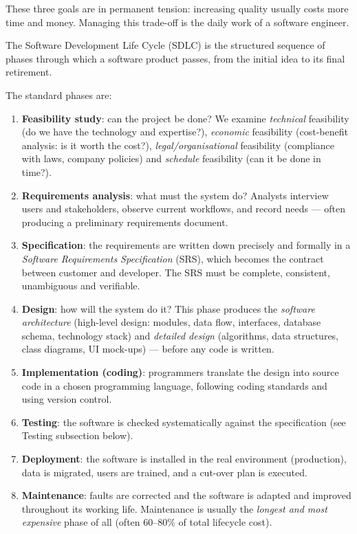\documentclass[11pt]{article}
\newcommand{\cle}[1]{{\popxbold\color{popdark}#1}}
\newcounter{popsec}
\newcounter{popsub}
\newcommand{\courssub}[1]{%
  \stepcounter{popsub}%
  \par\vspace{9pt}\noindent{\popxbold\fontsize{11.5}{13}\selectfont\color{popink}{\color{poporange}\thepopsec.\thepopsub}\hspace{6pt}#1}\par\nopagebreak\vspace{4pt}
}
\begin{document}
These three goals are in permanent tension: increasing quality usually costs more time and money. Managing this trade-off is the daily work of a software engineer.

\courssub{The Software Development Life Cycle (SDLC)}

\begin{definition}[SDLC]
The \cle{Software Development Life Cycle} (SDLC) is the structured sequence of phases through which a software product passes, from the initial idea to its final retirement.
\end{definition}

The standard phases are:

\begin{enumerate}
\item \textbf{Feasibility study}: can the project be done? We examine \emph{technical} feasibility (do we have the technology and expertise?), \emph{economic} feasibility (cost-benefit analysis: is it worth the cost?), \emph{legal/organisational} feasibility (compliance with laws, company policies) and \emph{schedule} feasibility (can it be done in time?).
\item \textbf{Requirements analysis}: what must the system do? Analysts interview users and stakeholders, observe current workflows, and record needs — often producing a preliminary requirements document.
\item \textbf{Specification}: the requirements are written down precisely and formally in a \emph{Software Requirements Specification} (SRS), which becomes the contract between customer and developer. The SRS must be complete, consistent, unambiguous and verifiable.
\item \textbf{Design}: how will the system do it? This phase produces the \emph{software architecture} (high-level design: modules, data flow, interfaces, database schema, technology stack) and \emph{detailed design} (algorithms, data structures, class diagrams, UI mock-ups) — before any code is written.
\item \textbf{Implementation (coding)}: programmers translate the design into source code in a chosen programming language, following coding standards and using version control.
\item \textbf{Testing}: the software is checked systematically against the specification (see Testing subsection below).
\item \textbf{Deployment}: the software is installed in the real environment (production), data is migrated, users are trained, and a cut-over plan is executed.
\item \textbf{Maintenance}: faults are corrected and the software is adapted and improved throughout its working life. Maintenance is usually the \emph{longest and most expensive} phase of all (often 60--80\% of total lifecycle cost).
\end{enumerate}
\end{document}
